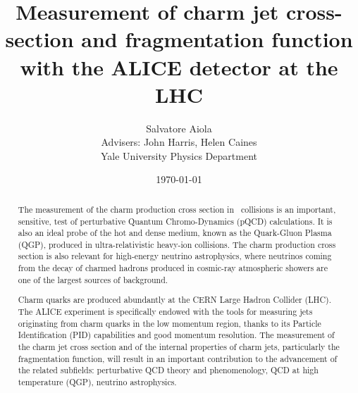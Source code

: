 \documentclass[12pt, a4paper, twoside, titlepage]{article}
\title{Measurement of charm jet cross-section and fragmentation function
with the ALICE detector at the LHC}
\author{Salvatore Aiola  \\
	Advisers: John Harris, Helen Caines \\
	Yale University Physics Department
	}
\date{\today}
\begin{document}
\maketitle

\begin{abstract}
The measurement of the charm production cross section in \pp\ collisions is an important, sensitive, test of perturbative Quantum Chromo-Dynamics (pQCD) calculations.
It is also an ideal probe of the hot and dense medium, known as the Quark-Gluon Plasma (QGP), produced in ultra-relativistic heavy-ion collisions.
The charm production cross section is also relevant for high-energy neutrino astrophysics, where neutrinos coming from the decay of charmed hadrons produced
in cosmic-ray atmospheric showers are one of the largest sources of background.

Charm quarks are produced abundantly at the CERN Large Hadron Collider (LHC). The ALICE experiment is specifically endowed with the tools for measuring
jets originating from charm quarks in the low momentum region, thanks to its Particle Identification (PID) capabilities and good momentum resolution.
The measurement of the charm jet cross section and of the internal properties of charm jets, particularly the fragmentation function, will result in an important
contribution to the advancement of the related subfields: perturbative QCD theory and phenomenology, QCD at high temperature (QGP), neutrino astrophysics.
\end{abstract}

\tableofcontents %
\newpage
\end{document}
